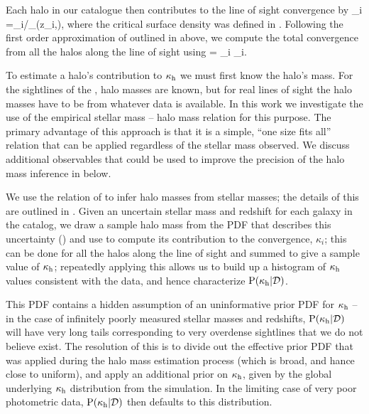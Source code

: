 \documentclass[useAMS,usenatbib]{mn2e}
\begin{document}
Each halo in our catalogue then contributes to
the line of sight convergence by
\be
\label{eq:kappai}
\kappa_i =\Sigma_{i}/\Sigma_{}(z_i,\zs),
\ee
where the critical surface density was defined in .
Following the first order approximation of \citet{HilbertEtal2009}
outlined in  above, we compute 
the total convergence from all the halos along the line
of sight using
\be 
\label{eq:kappasummu}
\kappah = \sum_{i} \kappa_i.
\ee

To estimate a halo's contribution to $\kappa_{\rm h}$ we must first know the
halo's mass. For the sightlines of the \MS, halo masses are
known, but for  real lines of sight the halo masses have to be \infered
from whatever data is available. 
In this work we investigate the use of the empirical stellar mass --
halo mass relation for this purpose. The primary advantage of this
approach is that it is a simple, ``one size fits all'' relation that can
be applied regardless of the stellar mass observed. We discuss
additional observables that could be used to improve the precision of
the halo mass inference in  below.

We use the relation of \citet{BehrooziEtal2010} to infer halo masses
from stellar masses; the details of this \proceedure are outlined in 
. Given an uncertain stellar mass and redshift for
each galaxy in the  catalog, we draw a sample halo mass from the PDF
that describes this uncertainty  ()  and use
 to compute its contribution to the convergence,
$\kappa_i$; this can be done for all the halos along the line of sight
and summed to give a sample value of $\kappa_{\rm h}$;  repeatedly applying
this \proceedure allows us to build up a histogram of $\kappa_{\rm h}$ values
consistent with the data, and hence characterize ${\rm P}(\kappa_{\rm h}|{\mathcal{D}})$. 

This PDF contains a hidden assumption of an uninformative prior PDF for
$\kappa_{\rm h}$ -- in the case of infinitely poorly measured stellar masses and
redshifts, ${\rm P}(\kappa_{\rm h}|{\mathcal{D}})$ will have very long tails corresponding to
very overdense sightlines that we do not believe exist. The resolution of this
is to divide out the effective prior PDF that was applied during the halo mass
estimation process (which is broad, and hance close to uniform), and apply an
additional prior on $\kappa_{\rm h}$, given by the global underlying $\kappa_{\rm h}$
distribution from the simulation. In the limiting  case of very poor
photometric data, ${\rm P}(\kappa_{\rm h}|{\mathcal{D}})$ then defaults to this distribution.
\end{document}
